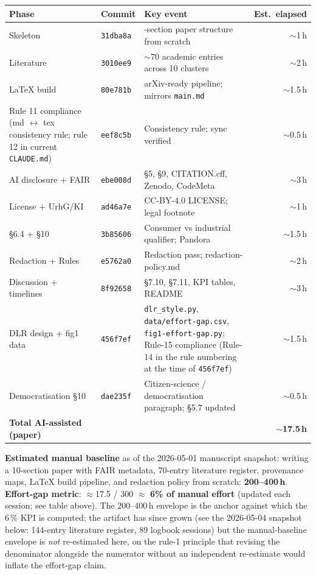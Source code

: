 \documentclass[11pt,a4paper]{article}
\begin{document}
\begin{center}
\begin{tabularx}{\linewidth}{@{}l l >{\raggedright\arraybackslash}X r@{}}
\toprule
Phase & Commit & Key event & Est.\ elapsed \\
\midrule
Skeleton             & \texttt{31dba8a} & 7-section paper structure from scratch & $\sim$1\,h \\
Literature           & \texttt{3010ee9} & $\sim$70 academic entries across 10 clusters & $\sim$2\,h \\
LaTeX build          & \texttt{80e781b} & arXiv-ready pipeline; mirrors \texttt{main.md} & $\sim$1.5\,h \\
Rule 11 compliance (md $\leftrightarrow$ tex consistency rule; rule 12 in current \texttt{CLAUDE.md})   & \texttt{eef8c5b} & Consistency rule; sync verified & $\sim$0.5\,h \\
AI disclosure + FAIR & \texttt{ebe008d} & §5, §9, CITATION.cff, Zenodo, CodeMeta & $\sim$3\,h \\
License + UrhG/KI   & \texttt{ad46a7e} & CC-BY-4.0 LICENSE; legal footnote & $\sim$1\,h \\
§6.4 + §10           & \texttt{3b85606} & Consumer vs industrial qualifier; Pandora & $\sim$1.5\,h \\
Redaction + Rules    & \texttt{e5762a0} & Redaction pass; redaction-policy.md & $\sim$2\,h \\
Discussion + timelines & \texttt{8f92658} & \S{}7.10, \S{}7.11, KPI tables, README & $\sim$3\,h \\
DLR design + fig1 data & \texttt{456f7ef} & \texttt{dlr\_style.py}, \texttt{data/effort-gap.csv}, \texttt{fig1-effort-gap.py}; Rule-15 compliance (Rule-14 in the rule numbering at the time of \texttt{456f7ef}) & $\sim$1.5\,h \\
Democratisation \S{}10 & \texttt{dae235f} & Citizen-science / democratisation paragraph; \S{}5.7 updated & $\sim$0.5\,h \\
\midrule
\textbf{Total AI-assisted (paper)} & & & \textbf{$\sim$17.5\,h} \\
\bottomrule
\end{tabularx}
\end{center}

\textbf{Estimated manual baseline} as of the 2026-05-01 manuscript
snapshot: writing a 10-section paper with FAIR metadata, 70-entry
literature register, provenance maps, LaTeX build pipeline, and
redaction policy from scratch: \textbf{200--400\,h}.
\textbf{Effort-gap metric}: $\approx$17.5 / 300 $\approx$ \textbf{6\% of manual effort} (updated each session; see table above). The 200--400\,h envelope is the anchor against which the 6\,\% KPI is computed; the artifact has since grown (see the 2026-05-04 snapshot below: 144-entry literature register, 89 logbook sessions) but the manual-baseline envelope is \emph{not} re-estimated here, on the rule-1 principle that revising the denominator alongside the numerator without an independent re-estimate would inflate the effort-gap claim.
\end{document}
